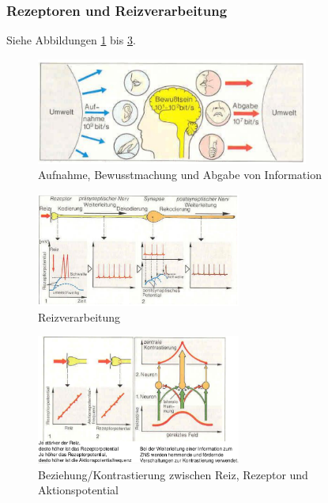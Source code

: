 \subsubsection{Rezeptoren und Reizverarbeitung}
Siehe Abbildungen \ref{sensinput} bis \ref{reizverarbeitung1}.
\begin{figure}[h!]
	\centering
	\includegraphics[width=0.8\textwidth]{figures/ch07_sensinput.png}
	\caption{Aufnahme, Bewusstmachung und Abgabe von Information}
	\label{sensinput}
\end{figure}
\begin{figure}[h!]
	\centering
	\includegraphics[width=0.6\textwidth]{figures/ch07_reizverarbeitung.png}
	\caption{Reizverarbeitung}
	\label{reizverarbeitung}
\end{figure}
\begin{figure}[h!]
	\centering
	\includegraphics[width=0.6\textwidth]{figures/ch04_reizverarbeitung1.png}
	\caption{Beziehung/Kontrastierung zwischen Reiz, Rezeptor und Aktionspotential}
	\label{reizverarbeitung1}
\end{figure}
